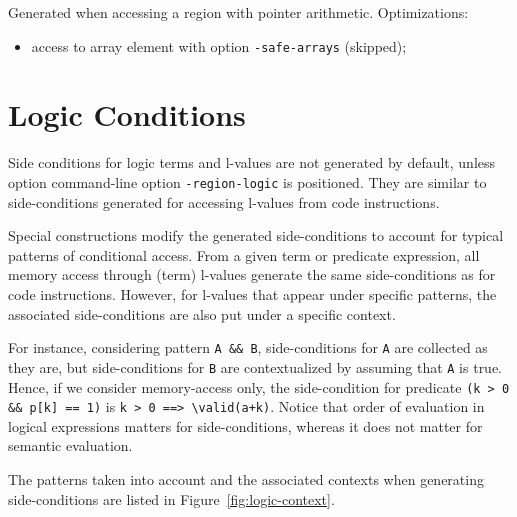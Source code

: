 Generated when accessing a region with pointer arithmetic.
Optimizations:
\begin{itemize}
  \item access to array element with option \verb+-safe-arrays+ (skipped);
\end{itemize}

\section{Logic Conditions}
\label{toc:logic}
Side conditions for logic terms and l-values are not generated by default,
unless option command-line option \verb+-region-logic+ is positioned. They are
similar to side-conditions generated for accessing l-values from code
instructions.

Special \acsl constructions modify the generated side-conditions to
account for typical patterns of conditional access. From a given term or
predicate expression, all memory access through (term) l-values generate the
same side-conditions as for \C code instructions. However, for l-values that
appear under specific patterns, the associated side-conditions are also put
under a specific context.

For instance, considering pattern \verb+A && B+, side-conditions for \verb+A+
are collected as they are, but side-conditions for \verb+B+ are contextualized
by assuming that \verb+A+ is true. Hence, if we consider memory-access only, the
side-condition for predicate \verb$(k > 0 && p[k] == 1)$
is \verb$k > 0 ==> \valid(a+k)$.
Notice that order of evaluation in logical expressions matters for
side-conditions, whereas it does not matter for semantic evaluation.

The patterns taken into account and the associated contexts when generating
side-conditions are listed in Figure~\ref{fig:logic-context}.

